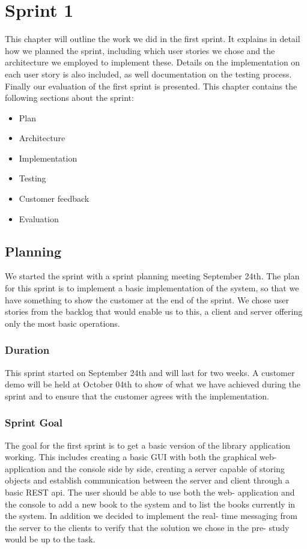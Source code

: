 \chapter{Sprint 1}

This chapter will outline the work we did in the first sprint. It explains in detail how we planned the sprint, including which user stories we chose and the architecture we employed to implement these. Details on the implementation on each user story is also included, as well documentation on the testing process. Finally our evaluation of the first sprint is presented. This chapter contains the following sections about the sprint:
\begin{itemize}
\item Plan
\item Architecture
\item Implementation
\item Testing
\item Customer feedback
\item Evaluation
\end{itemize}


\section{Planning}
We started the sprint with a sprint planning meeting September 24th. The plan for this sprint is to implement a basic implementation of the system, so that we have something to show the customer at the end of the sprint. We chose user stories from the backlog that would enable us to this, a client and server offering only the most basic operations. 

\subsection{Duration}
This sprint started on September 24th and will last for two weeks. A customer demo will be held at October 04th to show of what we have achieved during the sprint and to ensure that the customer agrees with the implementation.

\subsection{Sprint Goal}
The goal for the first sprint is to get a basic version of the library application working. This includes creating a basic GUI with both the graphical web- application and the console side by side, creating a server capable of storing objects and establish communication between the server and client through a basic REST api. The user should be able to use both the web- application and the console to add a new book to the system and to list the books currently in the system. In addition we decided to implement the real- time messaging from the server to the clients to verify that the solution we chose in the pre- study would be up to the task.

